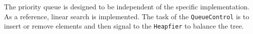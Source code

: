 \documentclass[conference]{IEEEtran}
\begin{document}
The priority queue is designed to be independent of the specific implementation. As a reference, linear search is implemented.
%
The task of the \texttt{QueueControl} is to insert or remove elements and then signal to the \texttt{Heapfier} to balance the tree. 
%
\end{document}
